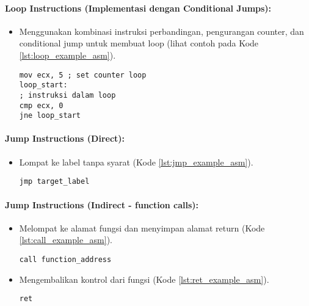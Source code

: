 \paragraph{Loop Instructions (Implementasi dengan Conditional Jumps):}
\begin{itemize}
	\item Menggunakan kombinasi instruksi perbandingan, pengurangan counter, dan conditional jump untuk membuat loop (lihat contoh pada Kode \ref{lst:loop_example_asm}).
	      \begin{verbatim}     
mov ecx, 5 ; set counter loop
loop_start:
; instruksi dalam loop
cmp ecx, 0
jne loop_start
    \end{verbatim}
    \label{lst:loop_example_asm}
\end{itemize}

\paragraph{Jump Instructions (Direct):}
\begin{itemize}
	\item {} Lompat ke label tanpa syarat (Kode \ref{lst:jmp_example_asm}).
	      \begin{verbatim}     
jmp target_label
    \end{verbatim}
    \label{lst:jmp_example_asm}
\end{itemize}

\paragraph{Jump Instructions (Indirect - function calls):}
\begin{itemize}
	\item {} Melompat ke alamat fungsi dan menyimpan alamat return (Kode \ref{lst:call_example_asm}).
	      \begin{verbatim}     
call function_address
    \end{verbatim}
    \label{lst:call_example_asm}

	\item {} Mengembalikan kontrol dari fungsi (Kode \ref{lst:ret_example_asm}).
	      \begin{verbatim}     
ret
    \end{verbatim}
    \label{lst:ret_example_asm}
\end{itemize}

